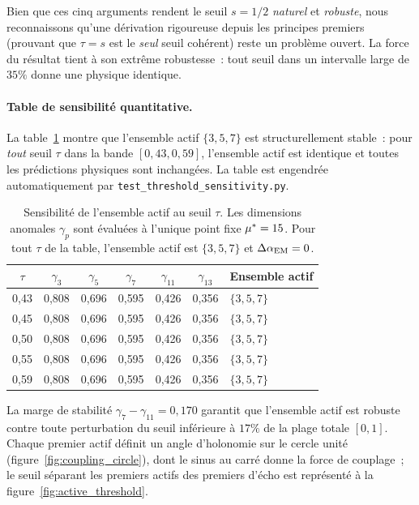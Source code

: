 \documentclass[12pt,a4paper]{article}
\begin{document}
\begin{remarque}
\noindent
Bien que ces cinq arguments rendent le seuil $s = 1/2$
\emph{naturel} et \emph{robuste}, nous reconnaissons qu'une
dérivation rigoureuse depuis les principes premiers (prouvant que
$\tau = s$ est le \emph{seul} seuil cohérent) reste un problème
ouvert. La force du résultat tient à son extrême robustesse~: tout
seuil dans un intervalle large de $35\%$ donne une physique
identique.
\end{remarque}

\paragraph{Table de sensibilité quantitative.}
La table~\ref{tab:threshold_sensitivity} montre que l'ensemble actif
$\{3,5,7\}$ est structurellement stable~: pour \emph{tout} seuil
$\tau$ dans la bande $[0{,}43, 0{,}59]$, l'ensemble actif est
identique et toutes les prédictions physiques sont inchangées. La
table est engendrée automatiquement par
\texttt{test\_threshold\_sensitivity.py}.

\begin{table}[htbp]
\centering
\caption{Sensibilité de l'ensemble actif au seuil $\tau$.
  Les dimensions anomales $\gamma_p$ sont évaluées à l'unique point
  fixe ${\mu^{*}} = 15$. Pour tout $\tau$ de la table, l'ensemble
  actif est $\{3,5,7\}$ et $\Delta\alpha_{\mathrm{EM}} = 0$.}
\label{tab:threshold_sensitivity}
\begin{tabular}{ccccccl}
\toprule
$\tau$ & $\gamma_3$ & $\gamma_5$ & $\gamma_7$ & $\gamma_{11}$
  & $\gamma_{13}$ & Ensemble actif \\
\midrule
0{,}43 & 0{,}808 & 0{,}696 & 0{,}595 & 0{,}426 & 0{,}356 & $\{3,5,7\}$ \\
0{,}45 & 0{,}808 & 0{,}696 & 0{,}595 & 0{,}426 & 0{,}356 & $\{3,5,7\}$ \\
0{,}50 & 0{,}808 & 0{,}696 & 0{,}595 & 0{,}426 & 0{,}356 & $\{3,5,7\}$ \\
0{,}55 & 0{,}808 & 0{,}696 & 0{,}595 & 0{,}426 & 0{,}356 & $\{3,5,7\}$ \\
0{,}59 & 0{,}808 & 0{,}696 & 0{,}595 & 0{,}426 & 0{,}356 & $\{3,5,7\}$ \\
\bottomrule
\end{tabular}
\end{table}

\noindent
La marge de stabilité $\gamma_7 - \gamma_{11} = 0{,}170$ garantit que
l'ensemble actif est robuste contre toute perturbation du seuil
inférieure à $17\%$ de la plage totale $[0,1]$.
Chaque premier actif définit un angle d'holonomie sur le cercle
unité (figure~\ref{fig:coupling_circle}), dont le sinus au carré
donne la force de couplage~; le seuil séparant les premiers actifs
des premiers d'écho est représenté à la
figure~\ref{fig:active_threshold}.
\end{document}
